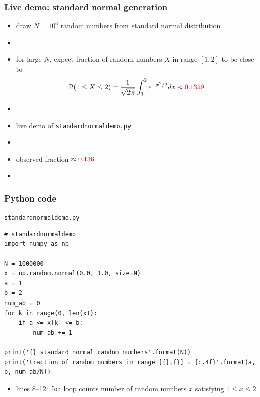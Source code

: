 \documentclass[english,14pt]{beamer}
\newcommand\red[1]{{\color{red} #1}}
\begin{document}

\begin{frame}[fragile]

\frametitle{Live demo: standard normal generation}

\begin{itemize}
	\item draw $N = 10^6$ random numbers from standard normal distribution
	\item[]
	\item for large $N$, expect fraction of random numbers $X$ in range $[1,2]$ to be close to
	\[
	\mathrm{P}(1 \leq X \leq 2)  = \frac{1}{\sqrt{2\pi}} \int_1^2 e^{-x^2/2} dx \approx \red{0.1359}
	\]
	\item[]
	\item live demo of \texttt{standardnormaldemo.py}
	\item[]
	\item observed fraction $\approx \red{0.136}$
	\item[]
\end{itemize}

\end{frame}


\begin{frame}[fragile]

\frametitle{Python code}

\texttt{standardnormaldemo.py}
\begin{lstlisting}[style=CStyle,basicstyle=\scriptsize]
# standardnormaldemo
import numpy as np

N = 1000000
x = np.random.normal(0.0, 1.0, size=N)
a = 1
b = 2
num_ab = 0
for k in range(0, len(x)):
    if a <= x[k] <= b:
        num_ab += 1

print('{} standard normal random numbers'.format(N))
print('Fraction of random numbers in range [{},{}] = {:.4f}'.format(a, b, num_ab/N))
\end{lstlisting}

\begin{itemize}
	\item lines 8--12: \texttt{for} loop counts number of random numbers $x$ satisfying $1 \leq x \leq 2$
\end{itemize}

\end{frame}

\end{document}
